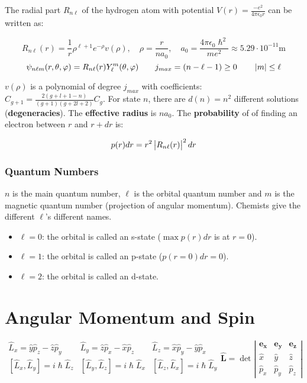 \documentclass{article}
\begin{document}
The radial part $R_{n\ell}$ of the hydrogen atom with potential $V(r) = \frac{-e^2}{4\pi\epsilon_0 r}$ can be written as:

$$R_{n\ell}(r) = \frac{1}{r} \rho^{\ell+1} e^{-\rho} v(\rho), \quad \rho = \frac{r}{n a_0}, \quad a_0 = \frac{4\pi \epsilon_0 \hslash^2}{m e^2} \approx  5.29 \cdot 10^{-11} \si{\meter}$$
$$\psi_{n\ell m}(r,\theta,\varphi) = R_{n\ell}(r) Y_\ell^m(\theta,\varphi) \qquad  j_{max} = (n-\ell-1) \geq 0 \qquad \left| m \right| \leq \ell$$

$v(\rho)$ is a polynomial of degree $j_{max}$ with coefficients: $C_{g+1} = \frac{2(g+l+1-n)}{(g+1)(g+2l+2)} C_g$. 
For state $n$, there are $d(n) = n^2$ different solutions (\textbf{degeneracies}). 
The \textbf{effective radius} is $n a_0$.
The \textbf{probability} of of finding an electron between $r$ and $r+dr$ is:

$$p(r) dr = r^2 \left| R_{n\ell}(r) \right|^2 dr$$

\subsubsection{Quantum Numbers}

$n$ is the main quantum number, $\ell$ is the orbital quantum number and $m$ is the magnetic quantum number (projection of angular momentum).
Chemists give the different $\ell$'s different names. 
\begin{itemize}
	\item $\ell = 0$: the orbital is called an s-state ($\max p(r) dr$ is at $r = 0$). 
	\item $\ell = 1$: the orbital is called an p-state ($p(r=0) dr = 0$).
	\item $\ell = 2$: the orbital is called an d-state.
\end{itemize}

\section{Angular Momentum and Spin}

$$ \begin{array}{lll}\hat L_x = \hat y \hat p_z - \hat z \hat p_y & \hat L_y = \hat z \hat p_x - \hat x \hat p_z & \hat L_z = \hat x \hat p_y - \hat y \hat p_x \\ \left[\hat L_x,\hat L_y\right] = i \hslash \hat L_z & \left[\hat L_y,\hat L_z\right] = i \hslash \hat L_x & \left[\hat L_z,\hat L_x\right] = i \hslash \hat L_y \\ \end{array} \hat{\bm{L}} = \det \left| \begin{array}{ccc} \bm{e_x} & \bm{e_y} & \bm{e_z} \\ \hat x & \hat y & \hat z \\ \hat p_x & \hat p_y & \hat p_z\end{array} \right| $$
\end{document}
